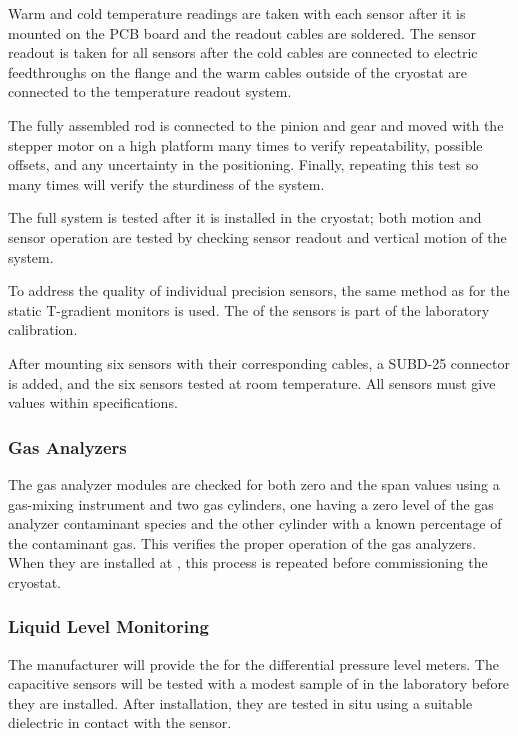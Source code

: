 Warm and cold temperature readings are taken with each sensor after it
is mounted on the PCB board and the readout cables are soldered.  The
sensor readout is taken for all sensors after the cold cables are
connected to electric feedthroughs on the flange and the warm cables
outside of the cryostat are connected to the temperature readout
system.

The fully assembled rod is connected to the pinion and gear and moved
with the stepper motor on a high platform many times to verify
repeatability, possible offsets, and any uncertainty in the
positioning. Finally, repeating this test so many times will verify
the sturdiness of the system.

The full system is tested after it is installed in the cryostat; both
motion and sensor operation are tested by checking sensor readout and
vertical motion of the system.

To address the quality of individual precision sensors, the same
method as for the static T-gradient monitors is used. The 
of the sensors is part of the laboratory calibration.

After mounting six sensors with their corresponding cables, a SUBD-25
connector is added, and the six sensors tested at room
temperature. All sensors must give values within specifications.

\subsubsection{Gas Analyzers}

The gas analyzer modules are checked for both zero and the span values
using a gas-mixing instrument and two gas cylinders, one having a zero
level of the gas analyzer contaminant species and the other cylinder
with a known percentage of the contaminant gas. This verifies the
proper operation of the gas analyzers. When they are installed at
, this process is repeated before commissioning the cryostat.

\subsubsection{Liquid Level Monitoring}

The manufacturer will provide the  for the differential pressure
level meters. The capacitive sensors will be tested with a modest
sample of  in the laboratory before they are installed. After
installation, they are tested in situ using a suitable dielectric in
contact with the sensor.

